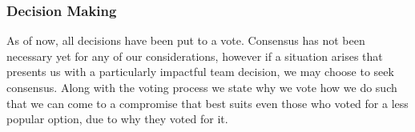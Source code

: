 \documentclass{article}
\begin{document}
\subsubsection*{Decision Making} 

As of now, all decisions have been put to a vote. Consensus has not been necessary yet for any of our considerations, however if a situation arises that presents us with a particularly impactful team decision, we may choose to seek consensus. Along with the voting process we state why we vote how we do such that we can come to a compromise that best suits even those who voted for a less popular option, due to why they voted for it.
\end{document}
